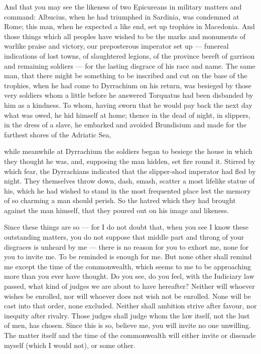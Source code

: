  And that you may see the likeness of two Epicureans in military matters and command: Albucius, when he had triumphed in Sardinia, was condemned at Rome; this man, when he expected a like end, set up trophies in Macedonia. And those things which all peoples have wished to be the marks and monuments of warlike praise and victory, our preposterous imperator set up — funereal indications of lost towns, of slaughtered legions, of the province bereft of garrison and remaining soldiers — for the lasting disgrace of his race and name. The same man, that there might be something to be inscribed and cut on the base of the trophies, when he had come to Dyrrachium on his return, was besieged by those very soldiers whom a little before he answered Torquatus had been disbanded by him as a kindness. To whom, having sworn that he would pay back the next day what was owed, he hid himself at home; thence in the dead of night, in slippers, in the dress of a slave, he embarked and avoided Brundisium and made for the farthest shores of the Adriatic Sea,

 while meanwhile at Dyrrachium the soldiers began to besiege the house in which they thought he was, and, supposing the man hidden, set fire round it. Stirred by which fear, the Dyrrachians indicated that the slipper-shod imperator had fled by night. They themselves throw down, dash, smash, scatter a most lifelike statue of his, which he had wished to stand in the most frequented place lest the memory of so charming a man should perish. So the hatred which they had brought against the man himself, that they poured out on his image and likeness.

 Since these things are so — for I do not doubt that, when you see I know these outstanding matters, you do not suppose that middle part and throng of your disgraces is unheard by me — there is no reason for you to exhort me, none for you to invite me. To be reminded is enough for me. But none other shall remind me except the time of the commonwealth, which seems to me to be approaching more than you ever have thought. Do you see, do you feel, with the Iudiciary law passed, what kind of judges we are about to have hereafter? Neither will whoever wishes be enrolled, nor will whoever does not wish not be enrolled. None will be cast into that order, none excluded. Neither shall ambition strive after favour, nor inequity after rivalry. Those judges shall judge whom the law itself, not the lust of men, has chosen. Since this is so, believe me, you will invite no one unwilling. The matter itself and the time of the commonwealth will either invite or dissuade myself (which I would not), or some other.

